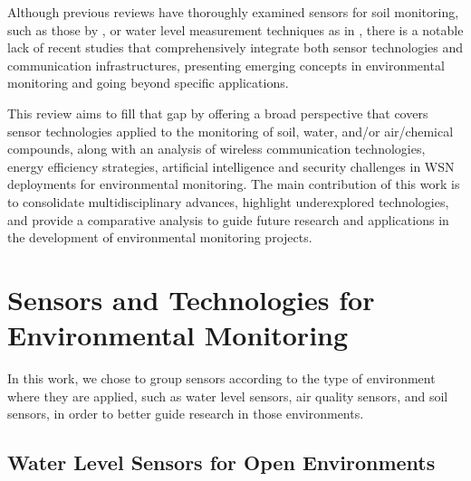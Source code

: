 \documentclass[conference]{IEEEtran}
\begin{document}
Although previous reviews have thoroughly examined sensors for soil monitoring, such as those by \cite{yin_2021_smart, teng_2014_soil, queiroz_2020_sensors}, or water level measurement techniques as in \cite{mohindru_2023_development, nr_2025_ai, wu_2023_a}, there is a notable lack of recent studies that comprehensively integrate both sensor technologies and communication infrastructures, presenting emerging concepts in environmental monitoring and going beyond specific applications.

This review aims to fill that gap by offering a broad perspective that covers sensor technologies applied to the monitoring of soil, water, and/or air/chemical compounds, along with an analysis of wireless communication technologies, energy efficiency strategies, artificial intelligence and security challenges in WSN deployments for environmental monitoring. The main contribution of this work is to consolidate multidisciplinary advances, highlight underexplored technologies, and provide a comparative analysis to guide future research and applications in the development of environmental monitoring projects.

\section{Sensors and Technologies for Environmental Monitoring} \label{cap:sensors}


In this work, we chose to group sensors according to the type of environment where they are applied, such as water level sensors, air quality sensors, and soil sensors, in order to better guide research in those environments.

\subsection{Water Level Sensors for Open Environments} \label{subsec:water_level_sensors}
\end{document}
